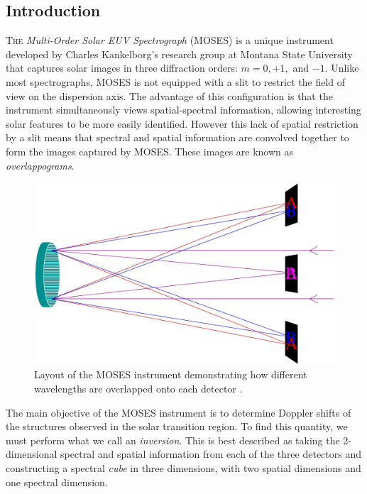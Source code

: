 \documentclass[twoside]{article}
\begin{document}
\begin{multicols}{2}
\section{Introduction}
\lettrine{T}{he} \textit{Multi-Order Solar EUV Spectrograph} (MOSES) is a unique instrument developed by Charles Kankelborg's research group at Montana State University that captures solar images in three diffraction orders: $m=0,+1,$ and $-1$. Unlike most spectrographs, MOSES is not equipped with a slit to restrict the field of view on the dispersion axis. The advantage of this configuration is that the instrument simultaneously views spatial-spectral information, allowing interesting solar features to be more easily identified. However this lack of spatial restriction by a slit means that spectral and spatial information are convolved together to form the images captured by MOSES. These images are known as \textit{overlappograms}. \par
\begin{figure}[H]
	\includegraphics[width=\linewidth]{images/instrument.eps}
	\caption{Layout of the MOSES instrument demonstrating how different wavelengths are overlapped onto each detector \cite{moses}.}
\end{figure}
The main objective of the MOSES instrument is to determine Doppler shifts of the structures observed in the solar transition region. To find this quantity, we must perform what we call an \textit{inversion}. This is best described as taking the 2-dimensional spectral and spatial information from each of the three detectors and constructing a spectral \textit{cube} in three dimensions, with two spatial dimensions and one spectral dimension.
\begin{figure}[H]

\end{figure}
\end{multicols}
\end{document}
